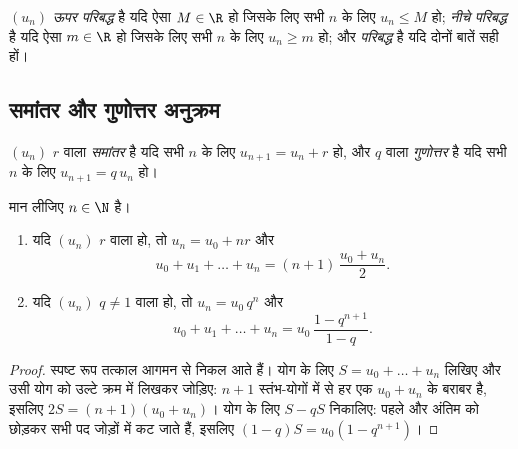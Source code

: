 \begin{definition}[परिबद्ध अनुक्रम]\label{def:g12:seq:bounded}
 $(u_n)$ \emph{ऊपर परिबद्ध} है यदि ऐसा $M \in \R$ हो
जिसके लिए सभी $n$ के लिए $u_n \leq M$ हो; \emph{नीचे परिबद्ध} है यदि ऐसा $m \in \R$ हो
जिसके लिए सभी $n$ के लिए $u_n \geq m$ हो; और \emph{परिबद्ध} है यदि दोनों बातें सही
हों।
\end{definition}

\subsection{समांतर और गुणोत्तर अनुक्रम}

\begin{definition}[समांतर और गुणोत्तर अनुक्रम]\label{def:g12:seq:arith-geom}
 $(u_n)$  $r$ वाला \emph{समांतर} है यदि
सभी $n$ के लिए $u_{n+1} = u_n + r$ हो, और  $q$ वाला
\emph{गुणोत्तर} है यदि सभी $n$ के लिए $u_{n+1} = q\,u_n$ हो।
\end{definition}

\begin{proposition}[स्पष्ट रूप और योग]\label{prop:g12:seq:arith-geom}
मान लीजिए $n \in \N$ है।
\begin{enumerate}
  \item यदि $(u_n)$  $r$ वाला  हो, तो $u_n = u_0 + nr$ और
        \[
        u_0 + u_1 + \dots + u_n = (n+1)\,\frac{u_0 + u_n}{2}.
        \]
  \item यदि $(u_n)$  $q \neq 1$ वाला  हो, तो $u_n = u_0\, q^n$ और
        \[
        u_0 + u_1 + \dots + u_n = u_0\,\frac{1 - q^{n+1}}{1 - q}.
        \]
\end{enumerate}
\end{proposition}

\begin{proof}
स्पष्ट रूप तत्काल आगमन से निकल आते हैं।  योग के लिए $S = u_0 + \dots + u_n$ लिखिए और उसी
योग को उल्टे क्रम में लिखकर जोड़िए: $n+1$ स्तंभ-योगों में से हर एक $u_0 + u_n$ के
बराबर है, इसलिए $2S = (n+1)(u_0+u_n)$।  योग के लिए $S - qS$ निकालिए: पहले और अंतिम को
छोड़कर सभी पद जोड़ों में कट जाते हैं, इसलिए $(1-q)S = u_0(1 - q^{n+1})$।
\end{proof}

